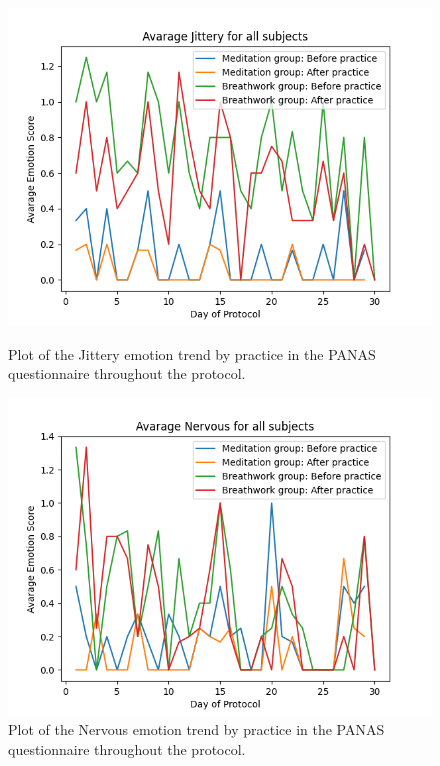 \begin{figure}
    \centering
    \begin{minipage}{0.49\linewidth}
        \includegraphics[width=\linewidth]{Figures/panas/emotions/Jittery.png}
        \caption{Plot of the Jittery emotion trend by practice in the PANAS questionnaire throughout the protocol.}
        \label{fig:jittery_by_practice}
    \end{minipage}
    \hfill %
    \begin{minipage}{0.49\linewidth}
        \includegraphics[width=\linewidth]{Figures/panas/emotions/Nervous.png}
        \caption{Plot of the Nervous emotion trend by practice in the PANAS questionnaire throughout the protocol.}
        \label{fig:nervous_by_practice}
    \end{minipage}
\end{figure} %

